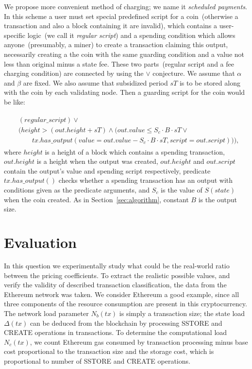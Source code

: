 \documentclass[]{llncs}   %
\newcommand{\authnote}[2]{\marginpar{\parbox{\marginparwidth}{\tiny %
  \textsf{#1 {\textcolor{blue}{notes: #2}}}}}%
  \textcolor{blue}{\textbf{\dag}}}
\newcommand{\authnote}[2]{
  \textsf{#1\textcolor{blue}{ #2}}}
\newcommand{\authnote}[2]{}
\newcommand{\dnote}[1]{{\authnote{\textcolor{red}{Dima notes:}}{#1}}}
\begin{document}
We propose more convenient method of charging; we name it {\em scheduled payments}. In this scheme a user must set special predefined script for a coin~(otherwise a transaction and also a block containing it are invalid), which contains a user-specific logic~(we call it {\em regular script}) and a spending condition which allows anyone~(presumably, a miner) to create a transaction claiming this output, necessarily creating a the coin with the same guarding condition and a value not less than original minus a state fee. These two parts~(regular script and a fee charging condition) are connected by using the $\lor$ conjecture. We assume that $\alpha$ and $\beta$ are fixed. We also assume that subsidized period $sT$ \dnote{sT in eq.1 is not a subsidized period! we don not have subsidized period term for now} is to be stored along with the coin by each validating node. Then a guarding script for the coin would be like:

\begin{align}
\begin{split}
&(regular\_script) \lor \\
&(height > (out.height + sT) \land (out.value \le S_c \cdot B \cdot sT \lor \\  
&\qquad tx.has\_output(value = out.value - S_c \cdot B \cdot sT, script = out.script))),
\end{split}
\end{align}
where $height$ is a height of a block which contains a spending transaction, $out.height$ is a height when the output was created, $out.height$ and $out.script$ contain the output's value and spending script respectively, predicate $tx.has\_output()$ checks whether a spending transaction has an output with conditions given as the predicate arguments, and $S_c$ is the value of $S(state)$ when the coin created. As in Section~\ref{sec:algorithm}, constant $B$ is the output size.     


\section{Evaluation}
\label{sec:evaluation}

In this question we experimentally study what could be the real-world
ratio between the pricing coefficients. To extract the realistic possible
values, and verify the validity of described transaction classification, the
data from the Ethereum network was taken. We consider Ethereum a good example,
since all three components of the resource consumption are present in this cryptocurrency. The network load parameter $N_b(tx)$ is simply a transaction size; the state
load $\Delta(tx)$ can be deduced from the blockchain by processing SSTORE
and CREATE operations in transactions. To determine the
computational load $N_c(tx)$, we count Ethereum gas consumed by transaction processing minus base cost proportional to the
transaction size and the storage cost, which is proportional to number of SSTORE and CREATE
operations.
\end{document}
